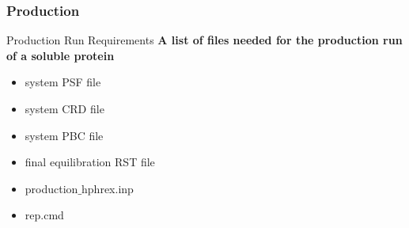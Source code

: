 \documentclass[9pt,tutorial]{livecoms}
\begin{document}
\subsubsection{Production}

\begin{checklist}{Production Run Requirements}
\textbf{A list of files needed for the production run of a soluble protein}
\begin{itemize}
\item system PSF file
\item system CRD file 
\item system PBC file
\item final equilibration RST file
\item production$\_$hphrex.inp
\item rep.cmd
\end{itemize}
\end{checklist}
\end{document}

